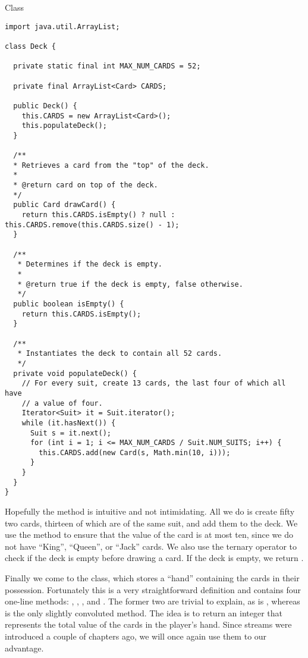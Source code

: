 \begin{cl}{ Class}
\begin{lstlisting}[language=MyJava]
import java.util.ArrayList;

class Deck {

  private static final int MAX_NUM_CARDS = 52;

  private final ArrayList<Card> CARDS;

  public Deck() {
    this.CARDS = new ArrayList<Card>();
    this.populateDeck();
  }

  /**
  * Retrieves a card from the "top" of the deck.
  *
  * @return card on top of the deck.
  */
  public Card drawCard() {
    return this.CARDS.isEmpty() ? null : this.CARDS.remove(this.CARDS.size() - 1);
  }

  /**
   * Determines if the deck is empty.
   *
   * @return true if the deck is empty, false otherwise.
   */
  public boolean isEmpty() {
    return this.CARDS.isEmpty();
  }

  /**
   * Instantiates the deck to contain all 52 cards.
   */
  private void populateDeck() {
    // For every suit, create 13 cards, the last four of which all have
    // a value of four.
    Iterator<Suit> it = Suit.iterator();
    while (it.hasNext()) {
      Suit s = it.next();
      for (int i = 1; i <= MAX_NUM_CARDS / Suit.NUM_SUITS; i++) {
        this.CARDS.add(new Card(s, Math.min(10, i)));
      }
    }
  }
}
\end{lstlisting}
\end{cl}

Hopefully the  method is intuitive and not intimidating. All we do is create fifty two cards, thirteen of which are of the same suit, and add them to the deck. We use the  method to ensure that the value of the card is at most ten, since we do not have ``King'', ``Queen'', or ``Jack'' cards. We also use the ternary operator to check if the deck is empty before drawing a card. If the deck is empty, we return .

Finally we come to the  class, which stores a ``hand'' containing the cards in their possession. Fortunately this is a very straightforward definition and contains four one-line methods: , , , and . The former two are trivial to explain, as is , whereas  is the only slightly convoluted method. The idea is to return an integer that represents the total value of the cards in the player's hand. Since streams were introduced a couple of chapters ago, we will once again use them to our advantage.

